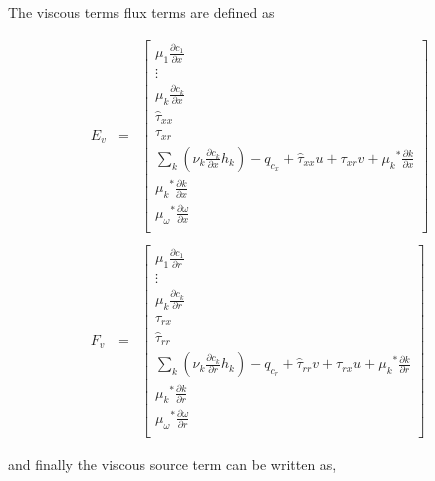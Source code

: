	The viscous terms flux terms are defined as 

\begin{equation}
  \begin{array}{ccc}
	E_v & = & \left[ \begin{array}{c}
		\mu_1 \frac{\partial c_1}{\partial x} \\
		\vdots \\
		\mu_k \frac{\partial c_k}{\partial x}  \\
		\hat{\tau}_{xx} \\
		\tau_{xr} \\
		\sum_k (\nu_k \frac{\partial c_k}{\partial x}h_k) 
			- q_{c_x} +  \hat \tau_{xx}u + \tau_{xr}v + {\mu_k}^* \frac{\partial k}{\partial x} \\
		{\mu_k}^* \frac{\partial k}{\partial x} \\
		{\mu_\omega}^* \frac{\partial \omega}{\partial x} \\
		   \end{array}
	    \right] 
	\\ & & \\
	F_v & = & \left[ \begin{array}{c}
		\mu_1 \frac{\partial c_1}{\partial r} \\
		\vdots \\
		\mu_k \frac{\partial c_k}{\partial r} \\
		\tau_{rx} \\
		\hat{\tau}_{rr} \\
		\sum_k (\nu_k \frac{\partial c_k}{\partial r}h_k)
			-  q_{c_r} + \hat \tau_{rr}v + \tau_{rx}u + {\mu_k}^* \frac{\partial k}{\partial r}\\
		{\mu_k}^* \frac{\partial k}{\partial r} \\
		{\mu_\omega}^* \frac{\partial \omega}{\partial r} \\
		   \end{array}
	    \right]
  \end{array}
\label{eqn:finalEvFv}
\end{equation}

	and finally the viscous source term can be written as,

